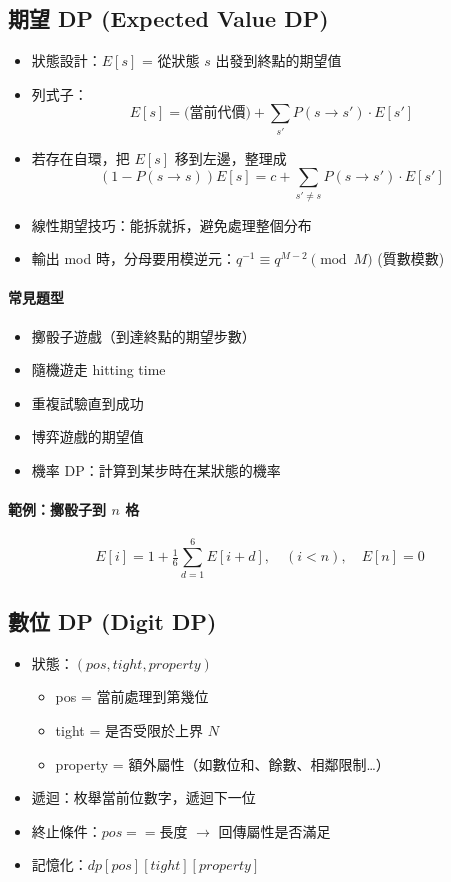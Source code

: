 \documentclass[a4paper,10pt,twocolumn,oneside]{article}
\begin{document}
\subsection{期望 DP (Expected Value DP)}

\begin{itemize}[nolistsep]
    \item 狀態設計：$E[s]$ = 從狀態 $s$ 出發到終點的期望值
    \item 列式子：
    \[
        E[s] = \text{(當前代價)} + \sum_{s'} P(s \to s') \cdot E[s']
    \]
    \item 若存在自環，把 $E[s]$ 移到左邊，整理成
    \[
        (1 - P(s \to s)) E[s] = c + \sum_{s' \neq s} P(s \to s') \cdot E[s']
    \]
    \item 線性期望技巧：能拆就拆，避免處理整個分布
    \item 輸出 mod 時，分母要用模逆元：$q^{-1} \equiv q^{M-2} \pmod{M}$ (質數模數)
\end{itemize}

\paragraph{常見題型}
\begin{itemize}[nolistsep]
    \item 擲骰子遊戲（到達終點的期望步數）
    \item 隨機遊走 hitting time
    \item 重複試驗直到成功
    \item 博弈遊戲的期望值
    \item 機率 DP：計算到某步時在某狀態的機率
\end{itemize}

\paragraph{範例：擲骰子到 $n$ 格}
\[
    E[i] = 1 + \tfrac{1}{6}\sum_{d=1}^6 E[i+d], \quad (i<n), 
    \quad E[n] = 0
\]



\subsection{數位 DP (Digit DP)}

\begin{itemize}[nolistsep]
    \item 狀態：$(pos, tight, property)$
    \begin{itemize}[nolistsep]
        \item pos = 當前處理到第幾位
        \item tight = 是否受限於上界 $N$
        \item property = 額外屬性（如數位和、餘數、相鄰限制…）
    \end{itemize}
    \item 遞迴：枚舉當前位數字，遞迴下一位
    \item 終止條件：$pos == \text{長度}$ $\to$ 回傳屬性是否滿足
    \item 記憶化：$dp[pos][tight][property]$
\end{itemize}
\end{document}
